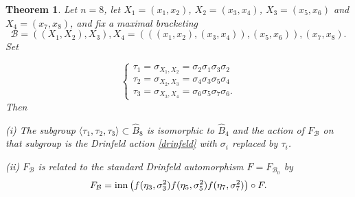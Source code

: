\documentclass[a4paper,10pt,reqno]{amsart}
\newcommand\B{\widehat{B}}
\newtheorem{thm}{Theorem}[section]
\begin{document}
\vspace{.2cm}
\begin{thm}\label{doublestrandsubgroup} Let $n=8$, let $X_1=(x_1,x_2)$, $X_2=(x_3,x_4)$,
$X_3=(x_5,x_6)$ and $X_4=(x_7,x_8)$, and fix a maximal bracketing
$${\mathcal{B}}=((X_1,X_2),X_3),X_4=(((x_1,x_2),(x_3,x_4)),(x_5,x_6)),
(x_7,x_8).$$
Set

\vspace{-0.8cm}
\begin{equation}\label{t12etc}
\begin{cases}
\tau_1=\sigma_{X_1,X_2}=\sigma_2\sigma_1\sigma_3\sigma_2\\
\tau_2=\sigma_{X_2,X_3}=\sigma_4\sigma_3\sigma_5\sigma_4\\
\tau_3=\sigma_{X_3,X_4}=\sigma_6\sigma_5\sigma_7\sigma_6.
\end{cases}
\end{equation}
Then 

\vspace{.1cm}\noindent 
(i) The subgroup $\langle \tau_1,\tau_2,\tau_3\rangle\subset
\B_8$ is isomorphic to $\B_4$ and the action of
$F_{\mathcal{B}}$ on that subgroup is the Drinfeld action \eqref{drinfeld}
with $\sigma_i$ replaced by $\tau_i$.

\vspace{.1cm}\noindent 
(ii) $F_{\mathcal{B}}$ is related to the standard Drinfeld automorphism $F=F_{\mathcal{B}_0}$ 
by 
$$F_{\mathcal{B}}={\rm inn}\,\bigl(f(\eta_3,\sigma_3^2)f(\eta_5,\sigma_5^2)f(\eta_7,\sigma_7^2)\bigr)\circ F.$$
\end{thm}
\end{document}

